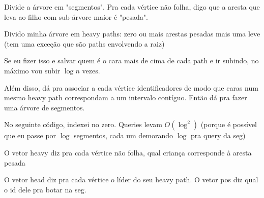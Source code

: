 Divide a árvore em "segmentos".
Pra cada vértice não folha, digo que a aresta que leva ao filho com sub-árvore
maior é "pesada".

Divido minha árvore em heavy paths: zero ou mais arestas pesadas mais uma leve (tem
uma exceção que são paths envolvendo a raiz)

Se eu fizer isso e salvar quem é o cara mais de cima de cada path e ir subindo, no
máximo vou subir $\log n$ vezes. 

Além disso, dá pra associar a cada vértice identificadores de modo que caras
num mesmo heavy path correspondam a um intervalo contíguo. Então dá pra fazer uma
árvore de segmentos.  

No seguinte código, indexei no zero. Queries levam $O(\log^2)$ (porque é possível que
eu passe por $\log$ segmentos, cada um demorando $\log$ pra query da seg)

O vetor heavy diz pra cada vértice não folha, qual criança corresponde à aresta pesada

O vetor head diz pra cada vértice o líder do seu heavy path. O vetor pos diz qual o
id dele pra botar na seg.

